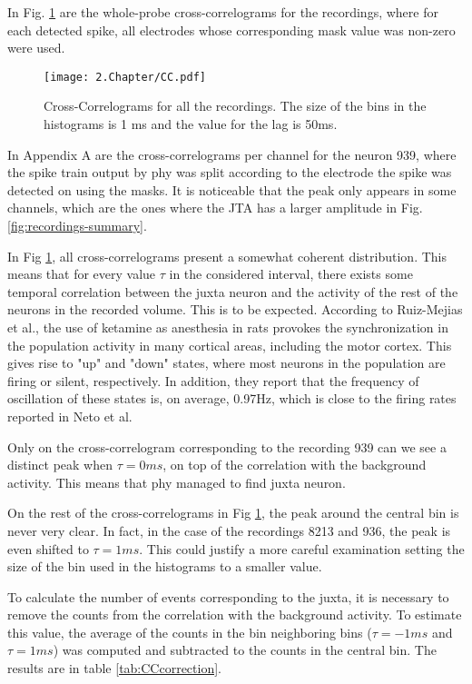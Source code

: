 In Fig. \ref{fig:CC} are the whole-probe cross-correlograms for the recordings, where for each detected spike, all electrodes whose corresponding mask value was non-zero were used.

\begin{figure}[!h]
	\centering
	\texttt{[image: 2.Chapter/CC.pdf]}
	\caption{Cross-Correlograms for all the recordings. The size of the bins in the histograms is 1 ms and the value for the lag is 50ms.
}
\label{fig:CC}
\end{figure}

In Appendix A are the cross-correlograms per channel for the neuron 939, where the spike train output by phy was split according to the electrode the spike was detected on using the masks. It is noticeable that the peak only appears in some channels, which are the ones where the JTA has a larger amplitude in Fig. \ref{fig:recordings-summary}.

In Fig \ref{fig:CC}, all cross-correlograms present a somewhat coherent distribution. This means that for every value $\tau$ in the considered interval, there exists some temporal correlation between the juxta neuron and the activity of the rest of the neurons in the recorded volume. This is to be expected. According to Ruiz-Mejias et al., the use of ketamine as anesthesia in rats provokes the synchronization in the population activity in many cortical areas, including the motor cortex. This gives rise to "up" and "down" states, where most neurons in the population are firing or silent, respectively. In addition, they report that the frequency of oscillation of these states is, on average, 0.97Hz, which is close to the firing rates reported in Neto et al. 

Only on the cross-correlogram corresponding to the recording 939 can we see a distinct peak when $\tau=0 ms$, on top of the correlation with the background activity. This means that phy managed to find juxta neuron.

On the rest of the cross-correlograms in Fig \ref{fig:CC}, the peak around the central bin is never very clear. In fact, in the case of the recordings 8213 and 936, the peak is even shifted to $\tau=1 ms$. This could justify a more careful examination setting the size of the bin used in the histograms to a smaller value.

To calculate the number of events corresponding to the juxta, it is necessary to remove the counts from the correlation with the background activity. To estimate this value, the average of the counts in the bin neighboring bins ($\tau = -1ms$ and $\tau = 1 ms$) was computed and subtracted to the counts in the central bin. The results are in table \ref{tab:CCcorrection}.

